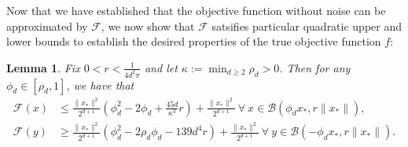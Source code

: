 \documentclass[11pt]{article}
\newcommand{\F}{\mathcal{F}}
\newtheorem{lem}{Lemma}
\theoremstyle{remark}
\begin{document}
Now that we have established that the objective function without noise can be approximated by $\mathcal{F}$, we now show that $\F$ satsifies particular quadratic upper and lower bounds to establish the desired properties of the true objective function $f$:
\begin{lem} \label{poly_bounds_on_conc_objective}
Fix $0 < r < \frac{1}{4d^2\pi}$ and let $\kappa := \min_{d \geqslant 2} \rho_d > 0$. Then for any $\phi_d \in [\rho_d, 1]$, we have that \begin{align}
    \mathcal{F}(x) & \leqslant \frac{\|x_*\|^2}{2^{d+1}}\left(\phi_d^2 - 2\phi_d + \frac{45d}{\kappa^3}r\right) + \frac{\|x_*\|^2}{2^{d+1}}\ \forall\ x \in \mathcal{B}(\phi_d x_*, r \|x_*\|), \label{conc_obj_upper_bound}\\
    \mathcal{F}(y) & \geqslant \frac{\|x_*\|^2}{2^{d+1}}(\phi_d^2 - 2\rho_d \phi_d - 139d^4r) + \frac{\|x_*\|^2}{2^{d+1}}\ \forall\ y \in \mathcal{B}(-\phi_d x_*, r \|x_*\|). \label{conc_obj_lower_bound}
\end{align}
\end{lem}
\end{document}

